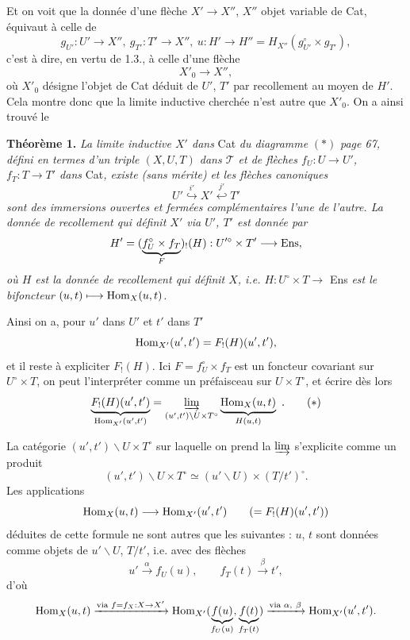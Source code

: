 Et on voit que la donnée d'une flèche $X'\longrightarrow X''$, $X''$ objet variable de Cat, équivaut à celle de
\[
g_{U'} : U'\longrightarrow X'',\ g_{T'} : T'\longrightarrow X'',\ u : H'\longrightarrow H'' = H_{X''}(g_{U'}^{\circ}\times g_{T'}),
\]
c'est à dire, en vertu de 1.3., à celle d'une flèche
\[
X'_0 \longrightarrow X'',
\]
où $X'_0$ désigne l'objet de Cat déduit de $U'$, $T'$ par recollement au moyen de $H'$. Cela montre donc que la limite inductive cherchée n'est autre que $X'_0$. On a ainsi trouvé le

\textbf{Théorème 1.} \textit{La limite inductive $X'$ dans} Cat \textit{du diagramme} $(*)$ \textit{page 67, défini en termes d'un triple $(X,U,T)$ dans $\mathcal{T}$ et de flèches $f_U : U\longrightarrow U'$, $f_T : T\longrightarrow T'$ dans} Cat\textit{, existe (sans mérite)}  \textit{et les flèches canoniques}
\[
U' \overset{i'}{\hookrightarrow} X' \overset{j'}{\hookleftarrow} T'
\]
\textit{sont des immersions ouvertes et fermées complémentaires l'une de l'autre. La donnée de recollement qui définit $X'$ via $U'$, $T'$ est donnée par}
\[
H' = (\underbrace{f_U^{\circ}\times f_T}_{F})_{!}(H) : U'^{\circ}\times T' \longrightarrow \mathrm{Ens},
\]
\textit{où $H$ est la donnée de recollement qui définit $X$, i.e. $H : U^{\circ}\times T\longrightarrow$} Ens \textit{est le bifoncteur $(u,t)\longmapsto \mathrm{Hom}_X(u,t)$.}

Ainsi on a, pour $u'$ dans $U'$ et $t'$ dans $T'$
\[
\mathrm{Hom}_{X'}(u',t') = F_{!}(H)(u',t'),
\]
et il reste à expliciter $F_{!}(H)$. Ici $F=f_U^{\circ}\times f_T$ est un foncteur covariant sur $U^{\circ}\times T$, on peut l'interpréter comme un préfaisceau sur $U\times T^{\circ}$, et écrire dès lors
\[
\underbrace{F_{!}(H)(u',t')}_{\Hom_{X'}(u',t')} = \varinjlim_{(u',t')\backslash U\times T^{\circ}} \underbrace{\Hom_X(u,t)}_{H(u,t)} \ .
\tag*{$(*)$}
\]

La catégorie $(u',t')\backslash U\times T^{\circ}$ sur laquelle on prend la $\varinjlim$ s'explicite comme un produit
\[
(u',t')\backslash U\times T^{\circ} \simeq (u'\backslash U)\times(T/t')^{\circ}.
\]
Les applications
\[
\mathrm{Hom}_X(u,t)\longrightarrow \mathrm{Hom}_{X'}(u',t') \qquad (=F_{!}(H)(u',t'))
\]
 déduites de cette formule ne sont autres que les suivantes : $u$, $t$ sont données comme objets de $u'\backslash U$, $T/t'$, i.e. avec des flèches
\[
u'\xrightarrow{\alpha} f_U(u), \qquad f_T(t)\xrightarrow{\beta} t',
\]
d'où
\[
\mathrm{Hom}_X(u,t) \xrightarrow{\text{via } f=f_X:X\to X'} \mathrm{Hom}_{X'}(\underbrace{f(u)}_{f_U(u)},\underbrace{f(t)}_{f_T(t)}) \xrightarrow{\text{via } \alpha,\ \beta} \mathrm{Hom}_{X'}(u',t').
\]


